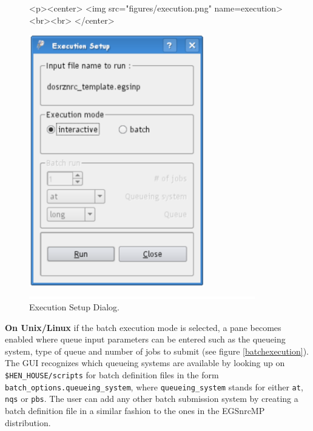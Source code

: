 \documentclass[12pt,twoside]{article}   %
\begin{document}
\begin{figure}[h]
\begin{htmlonly}
\begin{rawhtml}
<p><center>
<img src="figures/execution.png" name=execution><br><br>
</center>
\end{rawhtml}
\end{htmlonly}
\begin{latexonly}
\begin{center}
\includegraphics[height=11cm]{figures/execution}
\end{center}
\end{latexonly}
\begin{center}
\includegraphics[height=1mm]{figures/fake2}
\end{center}
\caption{Execution Setup Dialog.}
\label{execution}
\end{figure}

{\bf On Unix/Linux} if the batch execution mode is selected, a pane becomes enabled where
queue input parameters can be entered such as the queueing system, type of queue
and number of jobs to submit (see figure \ref{batchexecution}).
The GUI recognizes which queueing systems are available
by looking up on {\tt \$HEN\_HOUSE/scripts} for batch definition files in the form
{\tt batch\_options.queueing\_system},
where {\tt queueing\_system} stands for either {\tt at}, {\tt nqs} or {\tt pbs}. The user
can add any other batch submission system by creating a batch definition file in a similar
fashion to the ones in the EGSnrcMP distribution.
\end{document}
